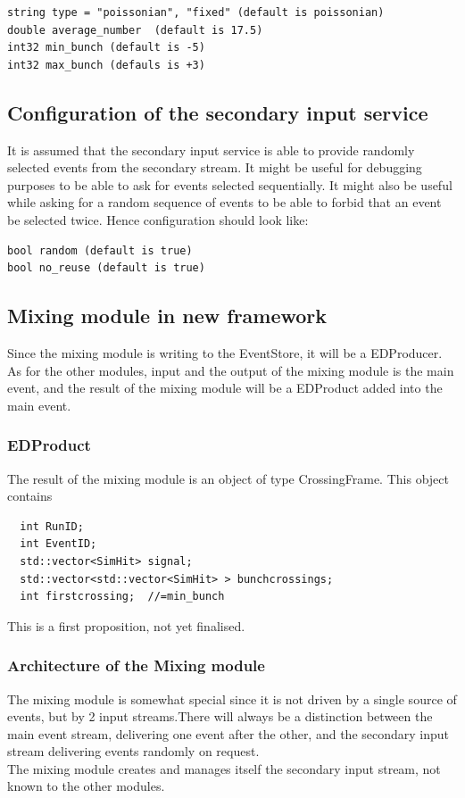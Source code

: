 \documentclass[draftmode]{memarticle}
\begin{document}
\begin{verbatim}
string type = "poissonian", "fixed" (default is poissonian)
double average_number  (default is 17.5)
int32 min_bunch (default is -5)
int32 max_bunch (defauls is +3)
\end{verbatim}
\subsection {Configuration of the secondary input service}
It is assumed that the secondary input service is able to provide randomly 
selected events from the secondary stream. It might be useful for debugging 
purposes to be able to ask for events selected sequentially. It might also 
be useful while asking for a random sequence of events to be able to forbid 
that 
an event be selected twice. Hence configuration should look like:

\begin{verbatim}
bool random (default is true)
bool no_reuse (default is true)
\end{verbatim}



\subsection { Mixing module in new framework }

Since the  mixing module is writing to the EventStore, it will be a EDProducer.
As for the other modules, input and the output of the mixing module is the main event, and the result of the mixing module will be a EDProduct added into 
the main event. 

\subsubsection {EDProduct}
The result of the mixing module is an object of type CrossingFrame. This object contains
\begin{verbatim}
  int RunID;
  int EventID;
  std::vector<SimHit> signal;
  std::vector<std::vector<SimHit> > bunchcrossings;
  int firstcrossing;  //=min_bunch
\end{verbatim}
\begin{fixme}
This is a first proposition, not yet finalised.
\end{fixme}

\subsubsection {Architecture of the Mixing module}
 The mixing module is somewhat special since it is 
not driven by a single source of events, but by 2 input streams.There will 
always be a distinction between the main event stream, delivering one event 
after the other, and the secondary input stream delivering events randomly on request.\\
The mixing module  creates and manages itself the secondary input stream, not 
known to the other modules.
\end{document}
